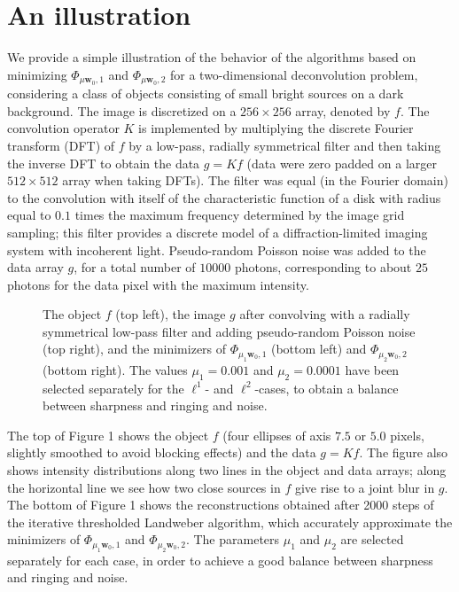 \documentclass[10pt]{article}
\begin{document}
\section{An illustration}
We provide a simple illustration of the behavior of the algorithms based on
minimizing
$\Phi_{\mu \mathbf{w}_0,1}$ and
$\Phi_{\mu \mathbf{w}_0,2}$ for a two-dimensional deconvolution
problem,
considering a class of objects consisting of small bright sources on a dark
background. The image is discretized on a $256 \times 256$ array,
denoted by  $f$. The convolution operator $K$ is
implemented by multiplying the discrete Fourier transform (DFT) of $f$
by a low-pass, radially symmetrical filter and then
taking the inverse DFT to obtain the data $g=Kf$ (data were zero padded on
a larger
$512 \times 512$ array when taking DFTs). The filter was equal
(in the Fourier domain) to the convolution with itself
of the characteristic function of a disk with radius equal to $0.1$ times the
maximum frequency determined by the image grid sampling;
this filter provides a discrete model of a diffraction-limited imaging
system with
incoherent light. Pseudo-random Poisson noise was
added to the data array $g$, for a total number of $10000$ photons,
corresponding to about $25$ photons for the data pixel with the maximum
intensity.

\begin{figure}[h!tb]
\begin{center}
\caption{The object $f$ (top left), the image $g$ after convolving
with a radially symmetrical low-pass filter and adding pseudo-random
Poisson noise (top right), and the minimizers of $\Phi_{\mu_1 \mathbf{w}_0,1}$
(bottom left) and $\Phi_{\mu_2 \mathbf{w}_0,2}$ (bottom right). The values
$\mu_1=0.001$ and $\mu_2=0.0001$ have been selected separately for the
$\ell^1$- and $\ell^2$-cases, to obtain a balance between
sharpness and ringing and noise. }
\end{center}
\end{figure}

The top of Figure 1 shows the object $f$ (four ellipses of axis
$7.5$ or $5.0$ pixels, slightly smoothed to avoid blocking effects)
and the data $g=Kf$. The figure also shows intensity
distributions along two lines in the object and data arrays; along the
horizontal line we see
how two close sources in $f$ give rise to a joint blur in $g$.
The bottom of Figure 1 shows the reconstructions obtained after
2000 steps of the iterative thresholded Landweber algorithm, which
accurately approximate the minimizers of $\Phi_{\mu_1 \mathbf{w}_0,1}$ and
$\Phi_{\mu_2 \mathbf{w}_0,2}$. The parameters $\mu_1$ and $\mu_2$
are selected separately for each case, in order to achieve a good balance
between
sharpness and ringing and noise.
\end{document}
